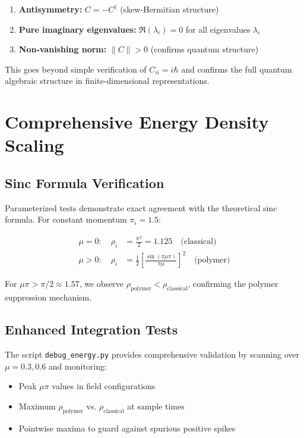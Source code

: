 \documentclass[11pt]{article}
\begin{document}
\begin{enumerate}
\item \textbf{Antisymmetry:} $C = -C^\dagger$ (skew-Hermitian structure)
\item \textbf{Pure imaginary eigenvalues:} $\Re(\lambda_i) = 0$ for all eigenvalues $\lambda_i$
\item \textbf{Non-vanishing norm:} $\|C\| > 0$ (confirms quantum structure)
\end{enumerate}

This goes beyond simple verification of $C_{ii} = i\hbar$ and confirms the full quantum algebraic structure in finite-dimensional representations.

\section{Comprehensive Energy Density Scaling}

\subsection{Sinc Formula Verification}
Parameterized tests demonstrate exact agreement with the theoretical sinc formula. For constant momentum $\pi_i = 1.5$:

\begin{align}
\mu = 0: \quad \rho_i &= \frac{\pi^2}{2} = 1.125 \quad \text{(classical)} \\
\mu > 0: \quad \rho_i &= \frac{1}{2}\left[\frac{\sin(\pi\mu\pi)}{\pi\mu}\right]^2 \quad \text{(polymer)}
\end{align}

For $\mu\pi > \pi/2 \approx 1.57$, we observe $\rho_{\text{polymer}} < \rho_{\text{classical}}$, confirming the polymer suppression mechanism.

\subsection{Enhanced Integration Tests}
The script \texttt{debug\_energy.py} provides comprehensive validation by scanning over $\mu = 0.3, 0.6$ and monitoring:
\begin{itemize}
\item Peak $\mu\pi$ values in field configurations
\item Maximum $\rho_{\text{polymer}}$ vs. $\rho_{\text{classical}}$ at sample times
\item Pointwise maxima to guard against spurious positive spikes
\end{itemize}
\end{document}
